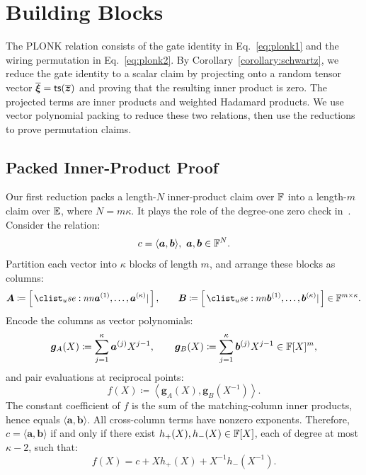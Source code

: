 \section{Building Blocks}
\label{sec:blocks}

The PLONK relation consists of the gate identity in
Eq.~\eqref{eq:plonk1} and the wiring permutation in
Eq.~\eqref{eq:plonk2}. By Corollary~\ref{corollary:schwartz},
we reduce the gate identity to a scalar claim by projecting onto
a random tensor vector
\(
    \overline{\bm{\xi}}
    =
    {\sf ts}(\overline{\bm z})
\)
and proving that the resulting inner product is zero. The projected
terms are inner products and weighted Hadamard products.
We use vector polynomial packing to reduce these two relations,
then use the reductions to prove permutation claims.

\subsection{Packed Inner-Product Proof}
\label{sec:ip}

Our first reduction packs a length-\(N\) inner-product claim over
\({\mathbb{F}}\) into a length-\(m\) claim over \(\mathbb{E}\),
where \(N=m\kappa\). It plays the role of the degree-one zero
check in~\cite{iacr/DaoT24}.
Consider the relation:
\[
    c=\langle\bm a,\bm b\rangle,
    ~
    \bm a,\bm b\in{\mathbb{F}}^N.
\]
Partition each vector into \(\kappa\) blocks of length \(m\), and
arrange these blocks as columns:
\begin{equation}
\label{eq:matAB}
    \bm A
    \coloneqq
    \concat{
        \bm a^{(1)},\ldots,\bm a^{(\kappa)}
    },
    \qquad
    \bm B
    \coloneqq
    \concat{
        \bm b^{(1)},\ldots,\bm b^{(\kappa)}
    }
    \in\Field^{m\times\kappa}.
\end{equation}
Encode the columns as vector polynomials:
\[
    \bm g_A(X)
    \coloneqq
    \sum_{j=1}^{\kappa}\bm a^{(j)}X^{j-1},
    \qquad
    \bm g_B(X)
    \coloneqq
    \sum_{j=1}^{\kappa}\bm b^{(j)}X^{j-1}
    \in{\mathbb{F}}[X]^m,
\]
and pair evaluations at reciprocal points:
\begin{equation}
    f(X)
    \coloneqq
    \left\langle
        \bm g_A(X),\bm g_B(X^{-1})
    \right\rangle.
\label{eq:ip-laurent-polynomial}
\end{equation}
The constant coefficient of \(f\) is the sum of the matching-column
inner products, hence equals \(\langle\bm a,\bm b\rangle\).
All cross-column terms have nonzero exponents. Therefore,
\(c=\langle\bm a,\bm b\rangle\) if and only if there exist
\(h_+(X),h_-(X)\in{\mathbb{F}}[X]\), each of degree at most
\(\kappa-2\), such that:
\begin{equation}
    f(X)
    =
    c
    +Xh_+(X)
    +X^{-1}h_-(X^{-1}).
\label{eq:ip-correction-identity}
\end{equation}

